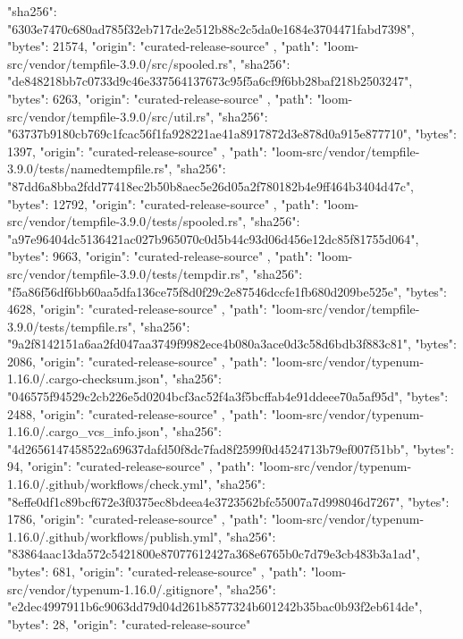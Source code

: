 {{      "sha256": "6303e7470c680ad785f32eb717de2e512b88c2c5da0e1684e3704471fabd7398",
      "bytes": 21574,
      "origin": "curated-release-source"
    },
    {
      "path": "loom-src/vendor/tempfile-3.9.0/src/spooled.rs",
      "sha256": "de848218bb7c0733d9c46e337564137673c95f5a6cf9f6bb28baf218b2503247",
      "bytes": 6263,
      "origin": "curated-release-source"
    },
    {
      "path": "loom-src/vendor/tempfile-3.9.0/src/util.rs",
      "sha256": "63737b9180cb769c1fcac56f1fa928221ae41a8917872d3e878d0a915e877710",
      "bytes": 1397,
      "origin": "curated-release-source"
    },
    {
      "path": "loom-src/vendor/tempfile-3.9.0/tests/namedtempfile.rs",
      "sha256": "87dd6a8bba2fdd77418ec2b50b8aec5e26d05a2f780182b4e9ff464b3404d47c",
      "bytes": 12792,
      "origin": "curated-release-source"
    },
    {
      "path": "loom-src/vendor/tempfile-3.9.0/tests/spooled.rs",
      "sha256": "a97e96404dc5136421ac027b965070c0d5b44c93d06d456e12dc85f81755d064",
      "bytes": 9663,
      "origin": "curated-release-source"
    },
    {
      "path": "loom-src/vendor/tempfile-3.9.0/tests/tempdir.rs",
      "sha256": "f5a86f56df6bb60aa5dfa136ce75f8d0f29c2e87546dccfe1fb680d209be525e",
      "bytes": 4628,
      "origin": "curated-release-source"
    },
    {
      "path": "loom-src/vendor/tempfile-3.9.0/tests/tempfile.rs",
      "sha256": "9a2f8142151a6aa2fd047aa3749f9982ece4b080a3ace0d3c58d6bdb3f883c81",
      "bytes": 2086,
      "origin": "curated-release-source"
    },
    {
      "path": "loom-src/vendor/typenum-1.16.0/.cargo-checksum.json",
      "sha256": "046575f94529c2cb226e5d0204bcf3ac52f4a3f5bcffab4e91ddeee70a5af95d",
      "bytes": 2488,
      "origin": "curated-release-source"
    },
    {
      "path": "loom-src/vendor/typenum-1.16.0/.cargo_vcs_info.json",
      "sha256": "4d2656147458522a69637dafd50f8dc7fad8f2599f0d4524713b79ef007f51bb",
      "bytes": 94,
      "origin": "curated-release-source"
    },
    {
      "path": "loom-src/vendor/typenum-1.16.0/.github/workflows/check.yml",
      "sha256": "8effe0df1c89bcf672e3f0375ec8bdeea4e3723562bfc55007a7d998046d7267",
      "bytes": 1786,
      "origin": "curated-release-source"
    },
    {
      "path": "loom-src/vendor/typenum-1.16.0/.github/workflows/publish.yml",
      "sha256": "83864aac13da572c5421800e87077612427a368e6765b0c7d79e3cb483b3a1ad",
      "bytes": 681,
      "origin": "curated-release-source"
    },
    {
      "path": "loom-src/vendor/typenum-1.16.0/.gitignore",
      "sha256": "e2dec4997911b6c9063dd79d04d261b8577324b601242b35bac0b93f2eb614de",
      "bytes": 28,
      "origin": "curated-release-source"
}}
